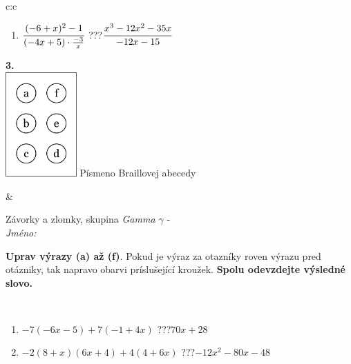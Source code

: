 \documentclass[10pt]{report}
\begin{document}
\begin{tabular}{c:c}
\begin{minipage}[c][104.5mm][t]{0.5\linewidth}
\begin{center}
\begin{minipage}{0.79\linewidth}
\begin{center}
\begin{varwidth}{\linewidth}
\begin{enumerate}
\item $\cfrac{(-6+x)^2-1}{(-4x+5)\cdot\frac{-3}{x}}$\quad \dotfill\; ???\;\dotfill \quad $\cfrac{x^3-12x^2-35x}{-12x-15}$
\end{enumerate}
\end{varwidth}
\end{center}
\end{minipage}
\begin{minipage}{0.20\linewidth}
\begin{center}
{\Huge\bfseries 3.} \\[2mm]
\includegraphics[height=40mm]{../images/braille.png}
{\small Písmeno Braillovej abecedy}
\end{center}
\end{minipage}
\end{center}
\end{minipage}
&
\begin{minipage}[c][104.5mm][t]{0.5\linewidth}
\begin{center}
\vspace{7mm}
{\huge Závorky a zlomky, skupina \textit{Gamma $\gamma$} -}\\[5mm]
\textit{Jméno:}\phantom{xxxxxxxxxxxxxxxxxxxxxxxxxxxxxxxxxxxxxxxxxxxxxxxxxxxxxxxxxxxxxxxxx}\\[5mm]
\begin{minipage}{0.95\linewidth}
\begin{center}
\textbf{Uprav výrazy (a) až (f)}. Pokud je výraz za otazníky roven výrazu pred otázniky, tak napravo obarvi príslušející kroužek. \textbf{Spolu odevzdejte výsledné slovo.}
\end{center}
\end{minipage}
\\[1mm]
\begin{minipage}{0.79\linewidth}
\begin{center}
\begin{varwidth}{\linewidth}
\begin{enumerate}
\normalsize
\item $-7(-6x-5)+7(-1+4x)$\quad \dotfill\; ???\;\dotfill \quad $70x+28$
\item $-2(8+x)(6x+4)+4(4+6x)$\quad \dotfill\; ???\;\dotfill \quad $-12x^2-80x-48$

\end{enumerate}
\end{varwidth}
\end{center}
\end{minipage}
\end{center}
\end{minipage}
\end{tabular}
\end{document}
